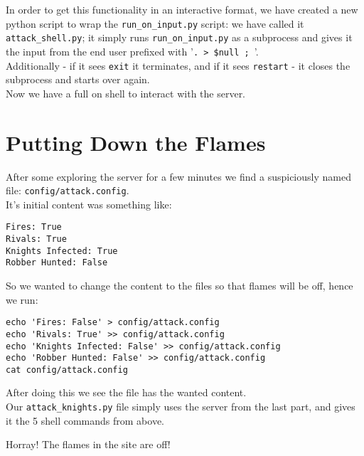 \documentclass{article}
\begin{document}
In order to get this functionality in an interactive format,
we have created a new python script to wrap the \texttt{run\_on\_input.py} script:
we have called it \texttt{attack\_shell.py}; it simply
runs \texttt{run\_on\_input.py} as a subprocess 
and gives it the input from the end user prefixed with '\texttt{. > \$null ; }'.\\
Additionally - if it sees \texttt{exit} it terminates, and
if it sees \texttt{restart} - it closes the subprocess and starts over again.\\

Now we have a full on shell to interact with the server.

\section{Putting Down the Flames}
After some exploring the server for a few minutes we find a suspiciously named
file: \texttt{config/attack.config}.\\
It's initial content was something like:
\begin{lstlisting}    
Fires: True
Rivals: True
Knights Infected: True
Robber Hunted: False
\end{lstlisting}

So we wanted to change the content to the files so that flames will be off,
hence we run:
\begin{lstlisting}
echo 'Fires: False' > config/attack.config
echo 'Rivals: True' >> config/attack.config
echo 'Knights Infected: False' >> config/attack.config
echo 'Robber Hunted: False' >> config/attack.config
cat config/attack.config
\end{lstlisting}
After doing this we see the file has the wanted content.\\

Our \texttt{attack\_knights.py} file simply uses the server from the last part,
and gives it the 5 shell commands from above.

Horray! The flames in the site are off!\\
\end{document}
